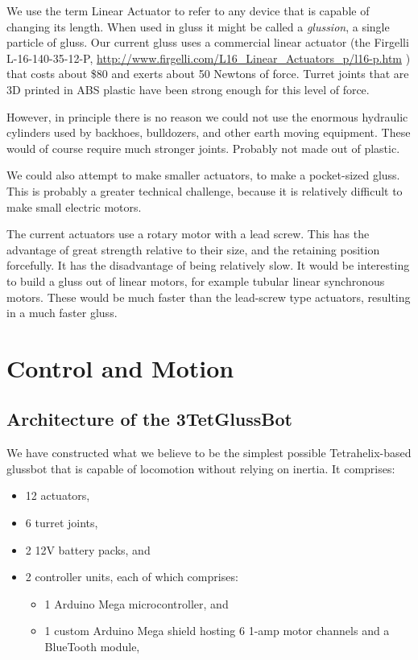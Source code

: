 \documentclass[11pt]{article}
\begin{document}
We use the term Linear Actuator to refer to any device that is capable of changing its length. When
used in gluss it might be called a \emph{glussion}, a single particle of gluss. Our current gluss
uses a commercial linear actuator (the Firgelli L-16-140-35-12-P,
\href{http://www.firgelli.com/L16_Linear_Actuators_p/l16-p.htm}{http://www.firgelli.com/L16\_Linear\_Actuators\_p/l16-p.htm}
)
that costs about \$80 and exerts about 50 Newtons of force.
Turret joints that are 3D printed in ABS plastic have been strong enough for this level of force.

However, in principle there is no reason we could not use the enormous hydraulic cylinders
used by backhoes, bulldozers, and other earth moving equipment. These would of course require much
stronger joints. Probably not made out of plastic.

We could also attempt to make smaller actuators, to make a pocket-sized gluss. This is probably
a greater technical challenge, because it is relatively difficult to make small electric motors.

The current actuators use a rotary motor with a lead screw. This has the advantage of great
strength relative to their size, and the retaining position forcefully. It has the disadvantage
of being relatively slow. It would be interesting to build a gluss out of linear motors, for
example tubular linear synchronous motors. These would be much faster than the lead-screw type
actuators, resulting in a much faster gluss. 

\section{Control and Motion}
\subsection{Architecture of the 3TetGlussBot}

We have constructed what we believe to be the simplest possible Tetrahelix-based glussbot that is capable of locomotion
without relying on inertia.
It comprises:
\begin{itemize}  
\item 12 actuators,
\item 6 turret joints,
\item 2 12V battery packs, and
\item 2 controller units, each of which comprises:
\begin{itemize}  
\item 1 Arduino Mega microcontroller, and
\item 1 custom Arduino Mega shield hosting 6 1-amp motor channels and a BlueTooth module,
\end{itemize}  
\end{itemize}
\end{document}
